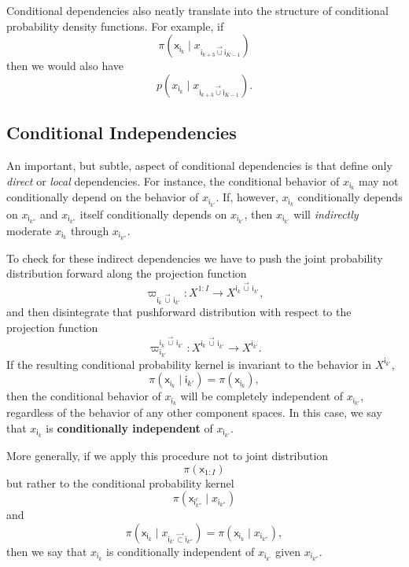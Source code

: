\documentclass[
  letterpaper,
  DIV=11,
  numbers=noendperiod]{scrartcl}
\begin{document}
Conditional dependencies also neatly translate into the structure of
conditional probability density functions. For example, if \[
\pi(
  \mathsf{x}_{ \mathsf{i}_{k} } \mid
  x_{ \mathsf{i}_{k + 3} \vec{\cup} \mathsf{i}_{K - 1} }
)
\] then we would also have \[
p(
  x_{ \mathsf{i}_{k} } \mid
  x_{ \mathsf{i}_{k + 3} \vec{\cup} \mathsf{i}_{K - 1} }
).
\]

\subsection{Conditional
Independencies}\label{conditional-independencies}

An important, but subtle, aspect of conditional dependencies is that
define only \emph{direct} or \emph{local} dependencies. For instance,
the conditional behavior of \(x_{ \mathsf{i}_{k} }\) may not
conditionally depend on the behavior of \(x_{ \mathsf{i}_{k'} }\). If,
however, \(x_{ \mathsf{i}_{k} }\) conditionally depends on
\(x_{ \mathsf{i}_{k''} }\) and \(x_{ \mathsf{i}_{k''} }\) itself
conditionally depends on \(x_{ \mathsf{i}_{k'} }\), then
\(x_{ \mathsf{i}_{k'} }\) will \emph{indirectly} moderate
\(x_{ \mathsf{i}_{k} }\) through \(x_{ \mathsf{i}_{k''} }\).

To check for these indirect dependencies we have to push the joint
probability distribution forward along the projection function \[
\varpi_{ \mathsf{i}_{k} \, \vec{\cup} \, \mathsf{i}_{k'} } :
X^{1:I}
\rightarrow
X^{ \mathsf{i}_{k} \, \vec{\cup} \, \mathsf{i}_{k'} },
\] and then disintegrate that pushforward distribution with respect to
the projection function \[
\varpi^{ \mathsf{i}_{k} \, \vec{\cup} \,
         \mathsf{i}_{k'} }_{ \mathsf{i}_{k'} } :
X^{ \mathsf{i}_{k} \, \vec{\cup} \, \mathsf{i}_{k'} }
\rightarrow
X^{ \mathsf{i}_{k'} }.
\] If the resulting conditional probability kernel is invariant to the
behavior in \(X^{ \mathsf{i}_{k'} }\), \[
\pi( \mathsf{x}_{ \mathsf{i}_{k} } \mid \mathsf{i}_{k'} )
=
\pi( \mathsf{x}_{ \mathsf{i}_{k} } ),
\] then the conditional behavior of \(x_{ \mathsf{i}_{k} }\) will be
completely independent of \(x_{ \mathsf{i}_{k'} }\), regardless of the
behavior of any other component spaces. In this case, we say that
\(x_{ \mathsf{i}_{k} }\) is \textbf{conditionally independent} of
\(x_{ \mathsf{i}_{k'} }\).

More generally, if we apply this procedure not to joint distribution \[
\pi( \mathsf{x}_{ 1:I } )
\] but rather to the conditional probability kernel \[
\pi(
  \mathsf{x}_{ \mathsf{i}_{k''}^{c} } \mid
  x_{ \mathsf{i}_{k''} }
)
\] and \[
\pi(
  \mathsf{x}_{ \mathsf{i}_{k} } \mid
  x_{ \mathsf{i}_{k'} \vec{\subset} \mathsf{i}_{k''} }
)
=
\pi( \mathsf{x}_{ \mathsf{i}_{k} } \mid x_{ \mathsf{i}_{k''} } ),
\] then we say that \(x_{ \mathsf{i}_{k} }\) is conditionally
independent of \(x_{ \mathsf{i}_{k'} }\) given
\(x_{ \mathsf{i}_{k''} }\).
\end{document}
